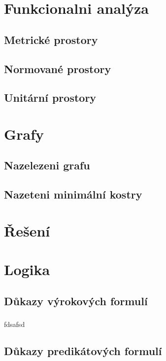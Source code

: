 \documentclass[12pt,a4paper,notitlepage,final]{article}
\begin{document}
\section{Funkcionalni analýza}
\subsection{Metrické prostory}                	
\subsection{Normované prostory}                	
\subsection{Unitární prostory}                	

\section{Grafy}
\subsection{Nazelezeni grafu}                	
\subsection{Nazeteni minimální kostry} 				

\section*{Řešení}
\setcounter{section}{1}
\section{Logika} \label{logika}
\subsection{Důkazy výrokových formulí}        
\subsubsection{}
fdsafsd
\subsection{Důkazy predikátových formulí}    
\end{document}
